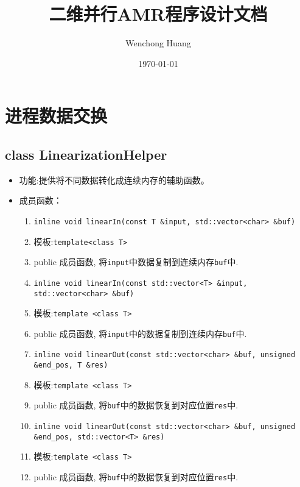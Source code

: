 \documentclass[cn, bibend=bibtex]{elegantpaper}
\title{二维并行AMR程序设计文档}
\author{Wenchong Huang}
\date{\today}
\theoremstyle{plain}
\begin{document}
\maketitle
\vspace{-1em}
\tableofcontents
\newpage


\section{进程数据交换}
\subsection{class LinearizationHelper}
\begin{itemize}
    \item 功能:提供将不同数据转化成连续内存的辅助函数。
    \item 成员函数：
    \begin{enumerate}
        \item \lstinline|inline void linearIn(const T &input, std::vector<char> &buf)|
        \item[] 模板:\lstinline|template<class T>|
        \item[] public 成员函数, 将\lstinline|input|中数据复制到连续内存\lstinline{buf}中.
        \item \lstinline|inline void linearIn(const std::vector<T> &input, std::vector<char> &buf)|
        \item[] 模板:\lstinline|template <class T>|
        \item[] public 成员函数, 将\lstinline|input|中的数据复制到连续内存\lstinline{buf}中.
        \item \lstinline|inline void linearOut(const std::vector<char> &buf, unsigned &end_pos, T &res)|
        \item[] 模板:\lstinline|template <class T>|
        \item[] public 成员函数, 将\lstinline|buf|中的数据恢复到对应位置\lstinline|res|中.
        \item \lstinline|inline void linearOut(const std::vector<char> &buf, unsigned &end_pos, std::vector<T> &res)|
        \item[] 模板:\lstinline|template <class T>|
        \item[] public 成员函数, 将\lstinline|buf|中的数据恢复到对应位置\lstinline|res|中.
    \end{enumerate}
\end{itemize}
\end{document}
